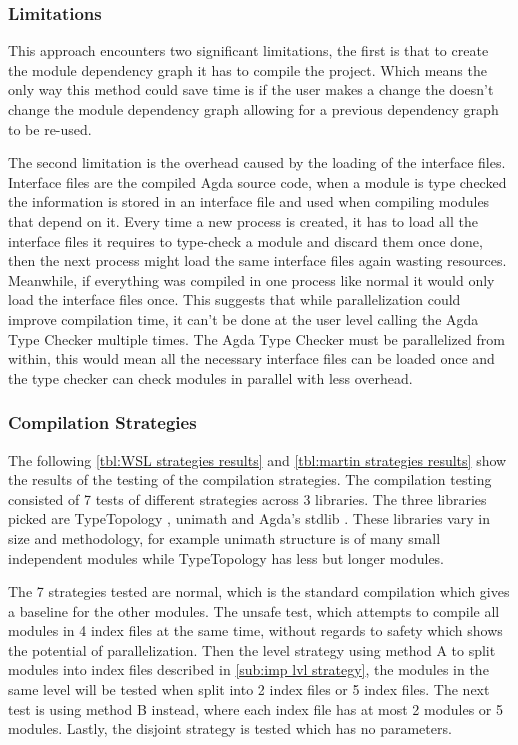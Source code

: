 \subsubsection{Limitations} \label{ssub:eval comp limitations}

This approach encounters two significant limitations, the first is that to
create the module dependency graph it has to compile the project. Which means
the only way this method could save time is if the user makes a change the
doesn't change the module dependency graph allowing for a previous dependency
graph to be re-used.

The second limitation is the overhead caused by the loading of the interface
files. Interface files are the compiled Agda source code, when a module is type
checked the information is stored in an interface file and used when compiling
modules that depend on it. Every time a new process is created, it has to load
all the interface files it requires to type-check a module and discard them
once done, then the next process might load the same interface files again
wasting resources. Meanwhile, if everything was compiled in one process like
normal it would only load the interface files once. This suggests that while
parallelization could improve compilation time, it can't be done at the user
level calling the Agda Type Checker multiple times. The Agda Type Checker must
be parallelized from within, this would mean all the necessary interface files
can be loaded once and the type checker can check modules in parallel with less
overhead.

\subsubsection{Compilation Strategies} \label{ssub:eval comp strat}

The following \cref{tbl:WSL strategies results} and \cref{tbl:martin
strategies results} show the results of the testing of the compilation
strategies. The compilation testing consisted of 7 tests of different
strategies across 3 libraries. The three libraries picked are TypeTopology
\cite{type-topology}, unimath \cite{agda-unimath} and Agda's stdlib
\cite{stdlib}. These libraries vary in size and methodology, for example
unimath structure is of many small independent modules while TypeTopology has
less but longer modules.

The 7 strategies tested are normal, which is the standard compilation which
gives a baseline for the other modules. The unsafe test, which attempts to
compile all modules in 4 index files at the same time, without regards to
safety which shows the potential of parallelization. Then the level strategy
using method A to split modules into index files described in 
\cref{sub:imp lvl strategy}, the modules in the same level will be tested when
split into 2 index files or 5 index files. The next test is using method B
instead, where each index file has at most 2 modules or 5 modules. Lastly, the
disjoint strategy is tested which has no parameters.

